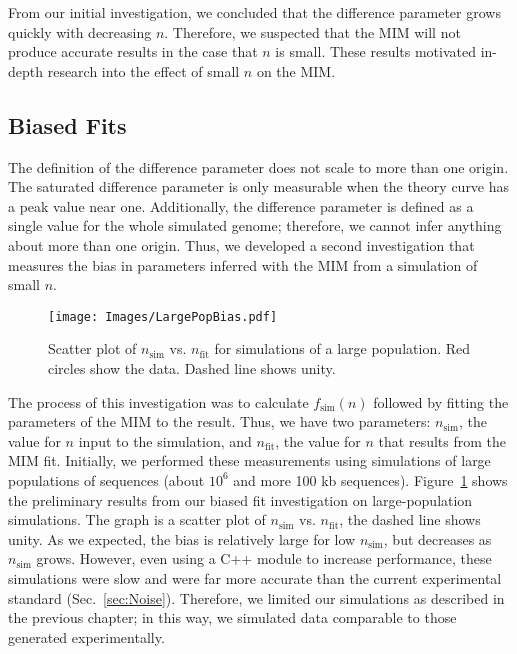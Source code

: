 		From our initial investigation, we concluded that the difference parameter grows quickly with decreasing $n$.
		Therefore, we suspected that the MIM will not produce accurate results in the case that $n$ is small.
		These results motivated in-depth research into the effect of small $n$ on the MIM.
		
		
		\subsection{Biased Fits}
		\label{subsec:BiasedFits}
		
		The definition of the difference parameter does not scale to more than one origin.
		The saturated difference parameter is only measurable when the theory curve has a peak value near one.
		Additionally, the difference parameter is defined as a single value for the whole simulated genome; therefore, we cannot infer anything about more than one origin.
		Thus, we developed a second investigation that measures the bias in parameters inferred with the MIM from a simulation of small $n$.
		
		\begin{figure}[tbh]
			\begin{center}
				\texttt{[image: Images/LargePopBias.pdf]}
			\end{center}
			\caption[Bias in MIM fit on Large-Population Simulations]{\label{fig:LargePopulation} Scatter plot of $n_\text{sim}$ vs. $n_\text{fit}$ for simulations of a large population.
			Red circles show the data. Dashed line shows unity.
			}
		\end{figure}
		
		The process of this investigation was to calculate $f_\text{sim}(n)$ followed by fitting the parameters of the MIM to the result.
		Thus, we have two parameters: $n_\text{sim}$, the value for $n$ input to the simulation, and $n_\text{fit}$, the value for $n$ that results from the MIM fit.
		Initially, we performed these measurements using simulations of large populations of sequences (about $10^6$ and more 100 kb sequences).
		Figure~\ref{fig:LargePopulation} shows the preliminary results from our biased fit investigation on large-population simulations.
		The graph is a scatter plot of $n_\text{sim}$ vs. $n_\text{fit}$, the dashed line shows unity.
		As we expected, the bias is relatively large for low $n_\text{sim}$, but decreases as $n_\text{sim}$ grows.
		However, even using a C++ module to increase performance, these simulations were slow and were far more accurate than the current experimental standard (Sec.~\ref{sec:Noise}).
		Therefore, we limited our simulations as described in the previous chapter; in this way, we simulated data comparable to those generated experimentally.
		
